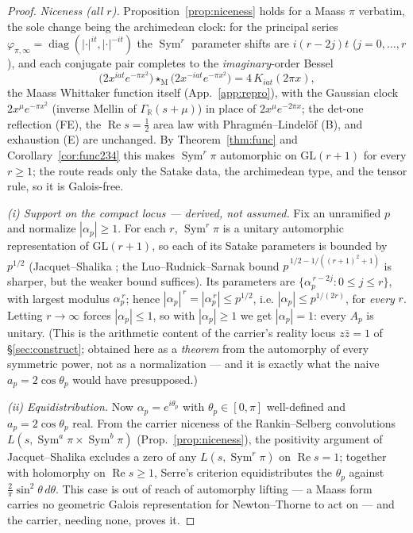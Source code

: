 \documentclass[11pt]{article}
\theoremstyle{definition}
\renewcommand{\Re}{\operatorname{Re}}
\newcommand{\Sym}{\operatorname{Sym}}
\begin{document}
\begin{proof}
\emph{Niceness (all $r$).} Proposition~\ref{prop:niceness} holds for a Maass $\pi$ verbatim, the sole change
being the archimedean clock: for the principal series
$\varphi_{\pi,\infty}=\operatorname{diag}(|\cdot|^{it},|\cdot|^{-it})$ the $\Sym^r$ parameter shifts are
$i(r-2j)t$ ($j=0,\dots,r$), and each conjugate pair completes to the \emph{imaginary}-order Bessel
\[
  \big(2x^{i a t}e^{-\pi x^2}\big)\star_{\mathrm M}\big(2x^{-i a t}e^{-\pi x^2}\big)=4\,K_{iat}(2\pi x),
\]
the Maass Whittaker function itself (App.~\ref{app:repro}), with the Gaussian clock $2x^{\mu}e^{-\pi x^2}$
(inverse Mellin of $\Gamma_{\mathbb R}(s+\mu)$) in place of $2x^\mu e^{-2\pi x}$; the det-one reflection
(FE), the $\Re s=\tfrac12$ area law with Phragm\'en--Lindel\"of (B), and exhaustion (E) are unchanged.
By Theorem~\ref{thm:func} and Corollary~\ref{cor:func234} this makes $\Sym^r\pi$ automorphic on
$\mathrm{GL}(r+1)$ for every $r\ge1$; the route reads only the Satake data, the archimedean type, and the
tensor rule, so it is Galois-free.

\emph{(i) Support on the compact locus --- derived, not assumed.} Fix an unramified $p$ and normalize
$|\alpha_p|\ge1$. For each $r$, $\Sym^r\pi$ is a unitary automorphic representation of $\mathrm{GL}(r+1)$,
so each of its Satake parameters is bounded by $p^{1/2}$ (Jacquet--Shalika \cite{JS}; the
Luo--Rudnick--Sarnak bound $p^{\,1/2-1/((r+1)^2+1)}$ \cite{LRS} is sharper, but the weaker bound suffices).
Its parameters are $\{\alpha_p^{\,r-2j}:0\le j\le r\}$, with largest modulus $\alpha_p^{\,r}$; hence
$|\alpha_p|^{\,r}=|\alpha_p^{\,r}|\le p^{1/2}$, i.e. $|\alpha_p|\le p^{1/(2r)}$, for \emph{every} $r$.
Letting $r\to\infty$ forces $|\alpha_p|\le1$, so with $|\alpha_p|\ge1$ we get $|\alpha_p|=1$: every $A_p$ is
unitary. (This is the arithmetic content of the carrier's reality locus $z\bar z=1$ of
\S\ref{sec:construct}; obtained here as a \emph{theorem} from the automorphy of every symmetric power, not
as a normalization --- and it is exactly what the naive $a_p=2\cos\theta_p$ would have presupposed.)

\emph{(ii) Equidistribution.} Now $\alpha_p=e^{i\theta_p}$ with $\theta_p\in[0,\pi]$ well-defined and
$a_p=2\cos\theta_p$ real. From the carrier niceness of the Rankin--Selberg convolutions
$L(s,\Sym^a\pi\times\Sym^b\pi)$ (Prop.~\ref{prop:niceness}), the positivity argument of Jacquet--Shalika
\cite{JS} excludes a zero of any $L(s,\Sym^r\pi)$ on $\Re s=1$; together with holomorphy on $\Re s\ge1$,
Serre's criterion \cite{Serre} equidistributes the $\theta_p$ against $\tfrac2\pi\sin^2\theta\,d\theta$.
This case is out of reach of automorphy lifting --- a Maass form carries no geometric Galois representation
for Newton--Thorne \cite{NT} to act on --- and the carrier, needing none, proves it.
\end{proof}
\end{document}

